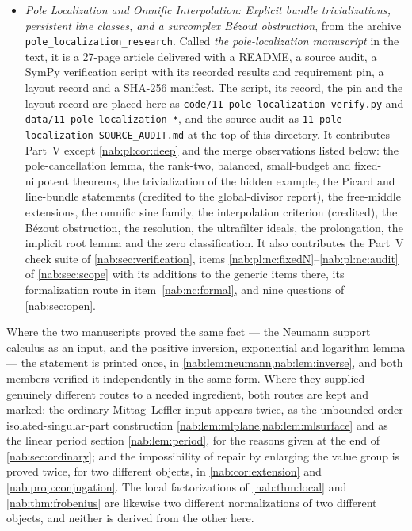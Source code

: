 \documentclass[11pt,letterpaper]{article}
\theoremstyle{definition}
\theoremstyle{remark}
\numberwithin{equation}{section}
\begin{document}
\begin{itemize}
\item \emph{Pole Localization and Omnific Interpolation: Explicit bundle
trivializations, persistent line classes, and a surcomplex B\'ezout
obstruction}, from the archive \texttt{pole\_localization\_research}. Called
\emph{the pole-localization manuscript} in the text, it is a 27-page article
delivered with a README, a source audit, a SymPy verification script with its
recorded results and requirement pin, a layout record and a SHA-256 manifest.
The script, its record, the pin and the layout record are placed here as
\nolinkurl{code/11-pole-localization-verify.py} and
\nolinkurl{data/11-pole-localization-*}, and the source audit as
\nolinkurl{11-pole-localization-SOURCE_AUDIT.md} at the top of this directory.
It contributes Part~V except \cref{nab:pl:cor:deep} and the merge observations
listed below: the pole-cancellation lemma, the rank-two, balanced,
small-budget and fixed-nilpotent theorems, the trivialization of the hidden
example, the Picard and line-bundle statements (credited to the global-divisor
report), the free-middle extensions, the omnific sine family, the interpolation
criterion (credited), the B\'ezout obstruction, the resolution, the ultrafilter
ideals, the prolongation, the implicit root lemma and the zero classification.
It also contributes the Part~V check suite of \cref{nab:sec:verification},
items \ref{nab:pl:nc:fixedN}--\ref{nab:pl:nc:audit} of \cref{nab:sec:scope}
with its additions to the generic items there, its formalization route in
item~\ref{nab:nc:formal}, and nine questions of \cref{nab:sec:open}.
\end{itemize}

Where the two manuscripts proved the same fact --- the Neumann support calculus
as an input, and the positive inversion, exponential and logarithm lemma ---
the statement is printed once, in
\cref{nab:lem:neumann,nab:lem:inverse}, and both members verified it
independently in the same form. Where they supplied genuinely different routes
to a needed ingredient, both routes are kept and marked: the ordinary
Mittag--Leffler input appears twice, as the unbounded-order
isolated-singular-part construction
\cref{nab:lem:mlplane,nab:lem:mlsurface} and as the linear period section
\cref{nab:lem:period}, for the reasons given at the end of
\cref{nab:sec:ordinary}; and the impossibility of repair by enlarging the value
group is proved twice, for two different objects, in
\cref{nab:cor:extension} and \cref{nab:prop:conjugation}. The local
factorizations of \cref{nab:thm:local} and \cref{nab:thm:frobenius} are
likewise two different normalizations of two different objects, and neither is
derived from the other here.
\end{document}
